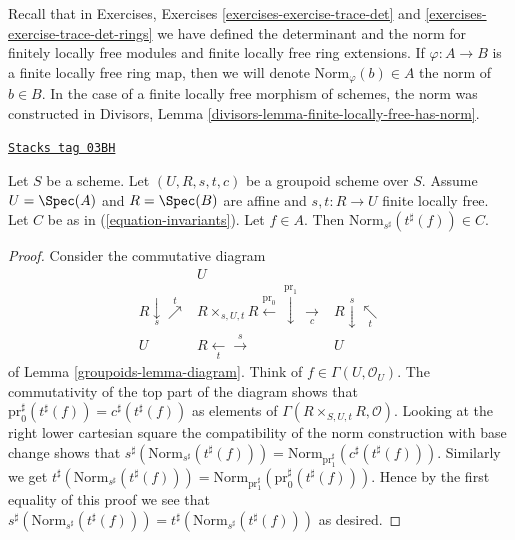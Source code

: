 Recall that in Exercises, Exercises \ref{exercises-exercise-trace-det} and
\ref{exercises-exercise-trace-det-rings} we have defined the determinant
and the norm for finitely locally free modules and finite locally free ring
extensions. If $\varphi : A \to B$ is a finite locally free ring map, then
we will denote $\text{Norm}_\varphi(b) \in A$ the norm of $b \in B$. In the
case of a finite locally free morphism of schemes, the norm was constructed
in Divisors, Lemma \ref{divisors-lemma-finite-locally-free-has-norm}.

\begin{lemma}
\label{groupoids-lemma-determinant-trick}
\href{https://stacks.math.columbia.edu/tag/03BH}{\texttt{Stacks tag 03BH}}

Let $S$ be a scheme. Let $(U, R, s, t, c)$ be a groupoid scheme over $S$.
Assume $U = \Spec(A)$ and $R = \Spec(B)$ are affine and
$s, t : R \to U$ finite locally free.
Let $C$ be as in (\ref{equation-invariants}).
Let $f \in A$. Then $\text{Norm}_{s^\sharp}(t^\sharp(f)) \in C$.
\end{lemma}

\begin{proof}

Consider the commutative diagram
$$
\begin{array}{ccc} & U &  \\ R \underset{s}{\downarrow}\overset{t}{\nearrow} & R \times_{s, U, t} R
\overset{\text{pr}_0}{\longleftarrow}\overset{\text{pr}_1}{\downarrow}\underset{c}{\longrightarrow} & R \overset{s}{\downarrow}\underset{t}{\nwarrow} \\ U & R \underset{t}{\longleftarrow}\overset{s}{\longrightarrow} & U\end{array}
$$
of Lemma \ref{groupoids-lemma-diagram}.
Think of $f \in \Gamma(U, \mathcal{O}_U)$. The commutativity of the
top part of the diagram shows that
$\text{pr}_0^\sharp(t^\sharp(f)) = c^\sharp(t^\sharp(f))$ as elements of
$\Gamma(R \times_{S, U, t} R, \mathcal{O})$.
Looking at the right lower cartesian square
the compatibility of the norm construction with base change shows that
$s^\sharp(\text{Norm}_{s^\sharp}(t^\sharp(f))) =
\text{Norm}_{\text{pr}_1^\sharp}(c^\sharp(t^\sharp(f)))$.
Similarly we get
$t^\sharp(\text{Norm}_{s^\sharp}(t^\sharp(f))) =
\text{Norm}_{\text{pr}_1^\sharp}(\text{pr}_0^\sharp(t^\sharp(f)))$.
Hence by the first equality of this proof we see that
$s^\sharp(\text{Norm}_{s^\sharp}(t^\sharp(f))) =
t^\sharp(\text{Norm}_{s^\sharp}(t^\sharp(f)))$ as desired.
\end{proof}

